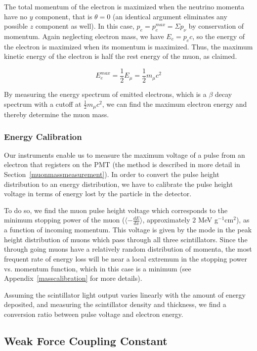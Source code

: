 The total momentum of the electron is maximized when the neutrino
momenta have no $y$ component, that is $\theta = 0$ (an identical argument
eliminates any possible $z$ component as well). In this case,
$p_e = p_e^{max} = \Sigma p_{\nu}$ by conservation of momentum. Again
neglecting electron mass, we have $E_e = p_ec$, so the energy of the
electron is maximized when its momentum is maximized. Thus, the
maximum kinetic energy of the electron is half the rest energy of the
muon, as claimed.

\begin{equation}E_e^{max} = \frac{1}{2}E_{\mu} = \frac{1}{2}m_{\mu}c^2\end{equation}

By measuring the energy spectrum of emitted electrons, which is a
$\beta$ decay spectrum with a cutoff at $\frac{1}{2}m_{\mu}c^2$, we
can find the maximum electron energy and thereby determine the muon
mass.

\subsubsection{Energy Calibration}\label{energycalibration}

Our instruments enable us to measure the maximum voltage of a pulse
from an electron that registers on the PMT (the method is described in
more detail in Section~\ref{muonmassmeasurement}). In order to convert
the pulse height distribution to an energy distribution, we have to
calibrate the pulse height voltage in terms of energy lost by the
particle in the detector.

To do so, we find the muon pulse height voltage which corresponds to
the minimum stopping power of the muon
($\langle-\frac{dE}{dx}\rangle$, approximately $2$ MeV
g$^{-1}$cm$^{2}$), as a function of incoming momentum. This voltage is
given by the mode in the peak height distribution of muons which pass
through all three scintillators. Since the through going muons have a
relatively random distribution of momenta, the most frequent rate of
energy loss will be near a local extremum in the stopping power
vs. momentum function, which in this case is a minimum (see
Appendix~\ref{masscalibration} for more details).

Assuming the scintillator light output varies linearly with the amount
of energy deposited, and measuring the scintillator density and
thickness, we find a conversion ratio between pulse voltage and
electron energy.

\subsection{Weak Force Coupling Constant}

